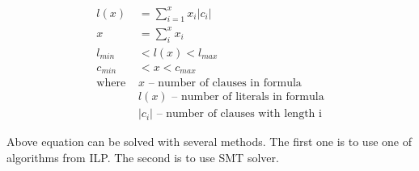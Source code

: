 \begin{align}
	l(x) &= \sum_{i=1}^{x} x_i |c_i| \\
	x &= \sum_i^x x_i \\
	l_{min} &< l(x) < l_{max} \\
	c_{min} &< x < c_{max} \\
	\text{where } 
		&x \text{ -- number of clauses in formula} \nonumber \\
		&l(x) \text{ -- number of literals in formula} \nonumber  \\
		&|c_i| \text{ -- number of clauses with length i} \nonumber
\end{align}

Above equation can be solved with several methods. The first one is to use one of algorithms from \gls{ILP}. The second is to use \gls{SMT} solver.
